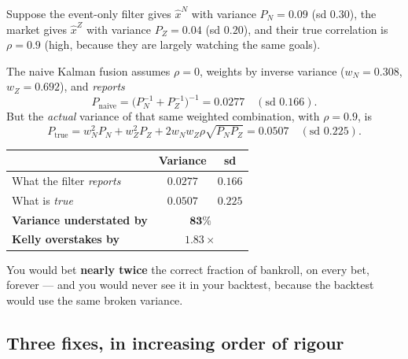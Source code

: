 \documentclass[11pt,a4paper]{article}
\theoremstyle{plain}
\begin{document}
\begin{worked}
Suppose the event-only filter gives $\hat x^N$ with variance $P_N = 0.09$ (sd $0.30$), the
market gives $\hat x^Z$ with variance $P_Z = 0.04$ (sd $0.20$), and their true correlation is
$\rho = 0.9$ (high, because they are largely watching the same goals).

\smallskip
The naive Kalman fusion assumes $\rho=0$, weights by inverse variance
($w_N = 0.308$, $w_Z = 0.692$), and \emph{reports}
\[
  P_{\text{naive}} = \big(P_N^{-1} + P_Z^{-1}\big)^{-1} = 0.0277 \quad (\text{sd } 0.166).
\]
But the \emph{actual} variance of that same weighted combination, with $\rho=0.9$, is
\[
  P_{\text{true}} = w_N^2 P_N + w_Z^2 P_Z + 2w_N w_Z \rho\sqrt{P_N P_Z} = 0.0507
  \quad (\text{sd } 0.225).
\]

\smallskip
\begin{center}
\begin{tabular}{@{}lcc@{}}
\toprule
& Variance & sd \\
\midrule
What the filter \emph{reports} & $0.0277$ & $0.166$ \\
What is \emph{true} & $0.0507$ & $0.225$ \\
\midrule
\textbf{Variance understated by} & \multicolumn{2}{c}{$\mathbf{83\%}$} \\
\textbf{Kelly overstakes by} & \multicolumn{2}{c}{$\mathbf{1.83\times}$} \\
\bottomrule
\end{tabular}
\end{center}

\smallskip
You would bet \textbf{nearly twice} the correct fraction of bankroll, on every bet, forever ---
and you would never see it in your backtest, because the backtest would use the same broken
variance.
\end{worked}

\subsection*{Three fixes, in increasing order of rigour}
\end{document}
